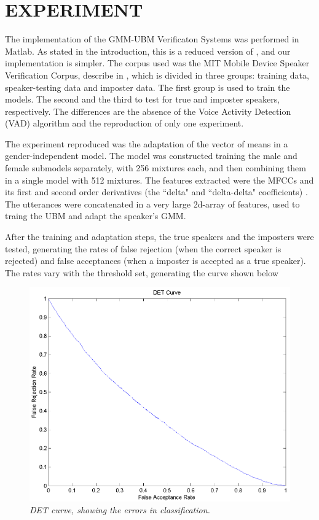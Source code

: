 \documentclass[a4paper,twocolumn]{article}
\begin{document}
\section{EXPERIMENT}

The implementation of the GMM-UBM Verificaton Systems was performed in Matlab. As stated in the introduction, this is a reduced version of \cite{reynolds_et_al_2000}, and our implementation is simpler. The corpus used was the MIT Mobile Device Speaker Verification Corpus, describe in \cite{corpus_paper}, which is divided in three groups: training data, speaker-testing data and imposter data. The first group is used to train the models. The second and the third to test for true and imposter speakers, respectively. The differences are the absence of the Voice Activity Detection (VAD) algorithm and the reproduction of only one experiment.

The experiment reproduced was the adaptation of the vector of means in a gender-independent model. The model was constructed training the male and female submodels separately, with 256 mixtures each, and then combining them in a single model with 512 mixtures. The features extracted were the MFCCs and its first and second order derivatives (the ``delta" and ``delta-delta" coefficients) \cite{pinheiro_2013}. The utterances were concatenated in a very large 2d-array of features, used to traing the UBM and adapt the speaker's GMM.

After the training and adaptation steps, the true speakers and the imposters were tested, generating the rates of false rejection (when the correct speaker is rejected) and false acceptances (when a imposter is accepted as a true speaker). The rates vary with the threshold set, generating the curve shown below

\begin{figure}[h]
    \label{fig:det}
    \centering
    \includegraphics[scale=0.2]{det}
    \caption{\textit{DET curve, showing the errors in classification.}}
\end{figure}
\end{document}
